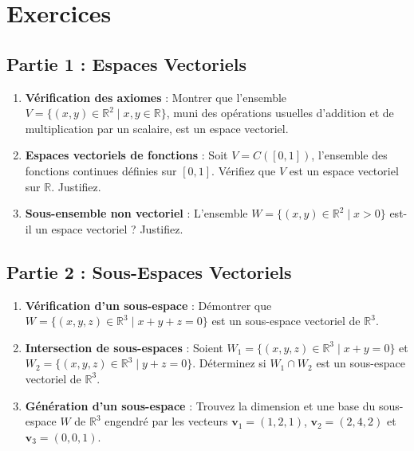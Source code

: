 \section*{Exercices}
\subsection*{Partie 1 : Espaces Vectoriels}
\begin{enumerate}
    \item \textbf{Vérification des axiomes} : 
    Montrer que l'ensemble \( V = \{(x, y) \in \mathbb{R}^2 \mid x, y \in \mathbb{R}\} \), muni des opérations usuelles d'addition et de multiplication par un scalaire, est un espace vectoriel.
    
    \item \textbf{Espaces vectoriels de fonctions} : 
    Soit \( V = C([0, 1]) \), l'ensemble des fonctions continues définies sur \([0, 1]\). Vérifiez que \( V \) est un espace vectoriel sur \( \mathbb{R} \). Justifiez.
    
    \item \textbf{Sous-ensemble non vectoriel} : 
    L'ensemble \( W = \{(x, y) \in \mathbb{R}^2 \mid x > 0\} \) est-il un espace vectoriel ? Justifiez.
\end{enumerate}

\subsection*{Partie 2 : Sous-Espaces Vectoriels}
\begin{enumerate}
    \item \textbf{Vérification d'un sous-espace} : 
    Démontrer que \( W = \{(x, y, z) \in \mathbb{R}^3 \mid x + y + z = 0\} \) est un sous-espace vectoriel de \( \mathbb{R}^3 \).

    \item \textbf{Intersection de sous-espaces} : 
    Soient \( W_1 = \{(x, y, z) \in \mathbb{R}^3 \mid x + y = 0\} \) et \( W_2 = \{(x, y, z) \in \mathbb{R}^3 \mid y + z = 0\} \). 
    Déterminez si \( W_1 \cap W_2 \) est un sous-espace vectoriel de \( \mathbb{R}^3 \).

    \item \textbf{Génération d'un sous-espace} : 
    Trouvez la dimension et une base du sous-espace \( W \) de \( \mathbb{R}^3 \) engendré par les vecteurs \( \mathbf{v}_1 = (1, 2, 1) \), \( \mathbf{v}_2 = (2, 4, 2) \) et \( \mathbf{v}_3 = (0, 0, 1) \).
\end{enumerate}

